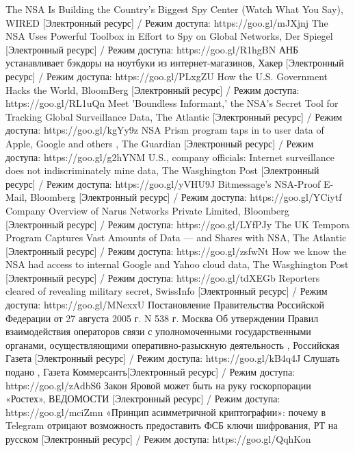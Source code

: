 \begin{thebibliography}{}
	  The NSA Is Building the Country’s Biggest Spy Center (Watch What You Say), WIRED [Электронный ресурс] / Режим доступа: https://goo.gl/mJXjnj
	 The NSA Uses Powerful Toolbox in Effort to Spy on Global Networks, Der Spiegel [Электронный ресурс] / Режим доступа: https://goo.gl/R1hgBN
	 АНБ устанавливает бэкдоры на ноутбуки из интернет-магазинов, Хакер [Электронный ресурс] / Режим доступа: https://goo.gl/PLxgZU
	 How the U.S. Government Hacks the World, BloomBerg [Электронный ресурс] / Режим доступа: https://goo.gl/RL1uQn
	 Meet 'Boundless Informant,' the NSA's Secret Tool for Tracking Global Surveillance Data, The Atlantic [Электронный ресурс] / Режим доступа: https://goo.gl/kgYy9z
	NSA Prism program taps in to user data of Apple, Google and others , The Guardian [Электронный ресурс] / Режим доступа: https://goo.gl/g2hYNM
	 U.S., company officials: Internet surveillance does not indiscriminately mine data, The Wasghington Post [Электронный ресурс] / Режим доступа: https://goo.gl/yVHU9J
	 Bitmessage's NSA-Proof E-Mail, Bloomberg [Электронный ресурс] / Режим доступа: https://goo.gl/YCiytf
	 Company Overview of Narus Networks Private Limited, Bloomberg [Электронный ресурс] / Режим доступа: https://goo.gl/LYfPJy
	 The UK Tempora Program Captures Vast Amounts of Data — and Shares with NSA, The Atlantic [Электронный ресурс] / Режим доступа: https://goo.gl/zsfwNt
	 How we know the NSA had access to internal Google and Yahoo cloud data, The Wasghington Post [Электронный ресурс] / Режим доступа: https://goo.gl/tdXEGb
	 Reporters cleared of revealing military secret, SwissInfo [Электронный ресурс] / Режим доступа: https://goo.gl/MNexxU
	 Постановление Правительства Российской Федерации от 27 августа 2005 г. N 538 г. Москва Об утверждении Правил взаимодействия операторов связи с уполномоченными государственными органами, осуществляющими оперативно-разыскную деятельность , Российская Газета  [Электронный ресурс] / Режим доступа: https://goo.gl/kB4q4J
	 Слушать подано ,  Газета  Коммерсантъ[Электронный ресурс] / Режим доступа: https://goo.gl/zAdbS6
	 Закон Яровой может быть на руку госкорпорации «Ростех»,    ВЕДОМОСТИ [Электронный ресурс] / Режим доступа: https://goo.gl/mciZmn
	 «Принцип асимметричной криптографии»: почему в Telegram отрицают возможность предоставить ФСБ ключи шифрования,    РТ на русском [Электронный ресурс] / Режим доступа: https://goo.gl/QqhKon

\end{thebibliography}
